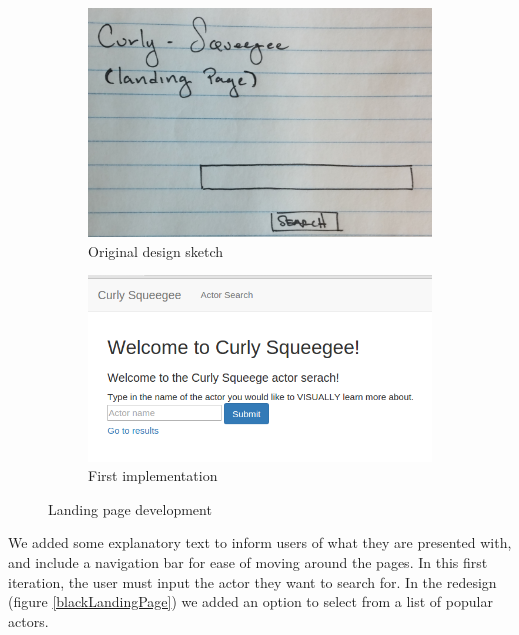 \documentclass[12pt]{article}
\begin{document}
	\begin{figure}[h!]
		\centering
		\begin{subfigure}[t]{.5\textwidth}
			  \centering
			  \includegraphics[scale=0.2]{images/landingPage_crop.png}
			  \caption{Original design sketch}
			  \label{fig:sub1}
		\end{subfigure}%
		\begin{subfigure}[t]{.5\textwidth}
			  \centering
			  \includegraphics[scale=0.4]{images/landingPage.png}
			  \caption{First implementation}
			  \label{fig:sub2}
		\end{subfigure}%
		\caption{Landing page development}
		\label{fig:landingPage}
	\end{figure}


 


We added some explanatory text to inform users of what they are presented with, and include a navigation bar for ease of moving around the pages. In this first iteration, the user must input the actor they want to search for.  In the redesign (figure \ref{blackLandingPage}) we added an option to select from a list of popular actors.
\end{document}

